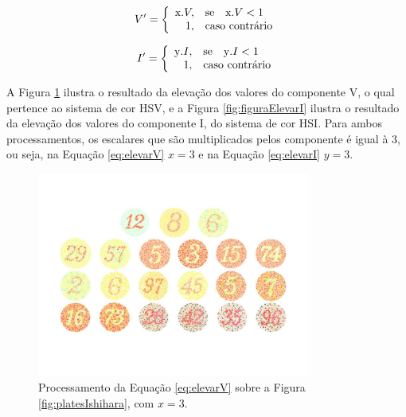 \documentclass[	12pt, Times, openright, twoside, a4paper, english, brazil]{abntex2}
\begin{document}
\begin{equation}
\label{eq:elevarV}
V'=\left\{
\begin{array}{rl}
       $x$ . V,&\mbox{se}\quad $x$ . V < 1 \\
       1,&\mbox{caso contrário}
\end{array}\right.
\end{equation}

\begin{equation}
\label{eq:elevarI}
I'=\left\{
\begin{array}{rl}
       $y$ . I,&\mbox{se}\quad $y$ . I < 1 \\
       1,&\mbox{caso contrário}
\end{array}\right.
\end{equation}

A Figura \ref{fig:figuraElevarV} ilustra o resultado da elevação dos valores do componente V, o qual pertence ao sistema de cor HSV, e a Figura \ref{fig:figuraElevarI} ilustra o resultado da elevação dos valores do componente I, do sistema de cor HSI. Para ambos processamentos, os escalares que são multiplicados pelos componente é igual à $3$, ou seja, na Equação \ref{eq:elevarV} $x=3$ e na Equação \ref{eq:elevarI} $y=3$.

\begin{figure}[!htb]
\centering \includegraphics[width=0.80\textwidth]{figuraElevarV.jpg}
\caption{Processamento da Equação \ref{eq:elevarV} sobre a Figura \ref{fig:platesIshihara}, com $x = 3$. \label{fig:figuraElevarV}}
\end{figure}
\end{document}
